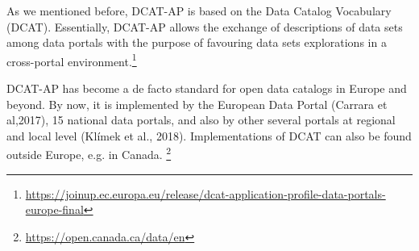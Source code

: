 \documentclass[<options>]{elsarticle}
\begin{document}
As we mentioned before, DCAT-AP is based on the Data Catalog Vocabulary (DCAT). Essentially, DCAT-AP allows the exchange of descriptions of data sets among data portals with the purpose of favouring data sets explorations in a cross-portal environment.\footnote{\href{DCAT Application Profile for Data Portals in Europe}{https://joinup.ec.europa.eu/release/dcat-application-profile-data-portals-europe-final}}

DCAT-AP has become a de facto standard for open data catalogs in Europe and beyond. By now, it is implemented by the European Data Portal (Carrara et al,2017), 15 national data portals, and also by other several portals at regional and local level (Klímek et al., 2018). Implementations of DCAT can also be found outside Europe, e.g. in Canada. \footnote{\href{https://open.canada.ca/data/en}{https://open.canada.ca/data/en}}
\end{document}
